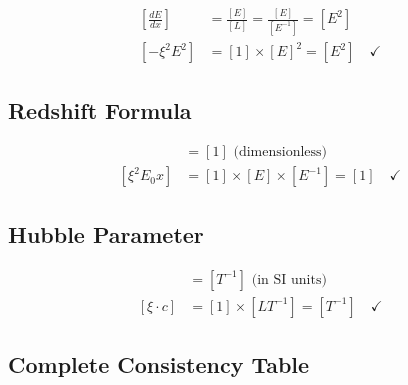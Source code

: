 	\begin{align}
		\left[\frac{dE}{dx}\right] &= \frac{[E]}{[L]} = \frac{[E]}{[E^{-1}]} = [E^2] \\
		\left[-\xi^2 E^2\right] &= [1] \times [E]^2 = [E^2] \quad \checkmark
	\end{align}
	
	\subsection{Redshift Formula}
	
	\begin{align}
		[z] &= [1] \text{ (dimensionless)} \\
		[\xi^2 E_0 x] &= [1] \times [E] \times [E^{-1}] = [1] \quad \checkmark
	\end{align}
	
	\subsection{Hubble Parameter}
	
	\begin{align}
		[H_0] &= [T^{-1}] \text{ (in SI units)} \\
		[\xi \cdot c] &= [1] \times [LT^{-1}] = [T^{-1}] \quad \checkmark
	\end{align}
	
	\subsection{Complete Consistency Table}
	
	\begin{table}[htbp]
		\centering
		\caption{Dimensional consistency verification}
		\label{tab:dimensional_check}
	\end{table}
	
